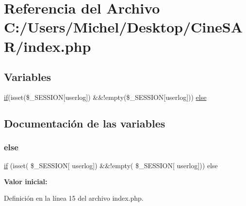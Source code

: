 \hypertarget{index_8php}{}\section{Referencia del Archivo C\+:/\+Users/\+Michel/\+Desktop/\+Cine\+S\+A\+R/index.php}
\label{index_8php}
\subsection*{Variables}
\begin{DoxyCompactItemize}
\item 
\mbox{\hyperlink{register_8php_aefb5893336d7ead40ae915367f4b82cc}{if}}(isset(\$\+\_\+\+S\+E\+S\+S\+I\+ON\mbox{[}\textquotesingle{}userlog\textquotesingle{}\mbox{]}) \&\&!empty(\$\+\_\+\+S\+E\+S\+S\+I\+ON\mbox{[}\textquotesingle{}userlog\textquotesingle{}\mbox{]})) \mbox{\hyperlink{index_8php_a3e85a20b0f9c4bed1d7e6bf901f6030c}{else}}
\end{DoxyCompactItemize}


\subsection{Documentación de las variables}
\mbox{\label{index_8php_a3e85a20b0f9c4bed1d7e6bf901f6030c}} 
\subsubsection{\texorpdfstring{else}{else}}
{\footnotesize\ttfamily \mbox{\hyperlink{register_8php_aefb5893336d7ead40ae915367f4b82cc}{if}} (isset( \$\+\_\+\+S\+E\+S\+S\+I\+ON\mbox{[} \textquotesingle{}userlog\textquotesingle{}\mbox{]}) \&\&!empty( \$\+\_\+\+S\+E\+S\+S\+I\+ON\mbox{[} \textquotesingle{}userlog\textquotesingle{}\mbox{]})) else}

{\bfseries Valor inicial\+:}
\begin{DoxyCode}{0}
\DoxyCodeLine{\{}

\end{DoxyCode}


Definición en la línea 15 del archivo index.\+php.

